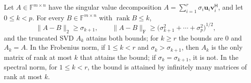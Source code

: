 \begin{theorem}
\label{thm:eckart-young}
Let $A\in\mathbb F^{m\times n}$ have the singular value decomposition $A=\sum_{i=1}^r\sigma_i\mathbf u_i\mathbf v_i^{\mathsf H}$, and let $0\le k<p$. For every $B\in\mathbb F^{m\times n}$ with $\operatorname{rank}B\le k$,
\[
\|A-B\|_2\ge\sigma_{k+1},\qquad\|A-B\|_{\mathrm F}\ge\bigl(\sigma_{k+1}^2+\cdots+\sigma_p^2\bigr)^{1/2},
\]
and the truncated SVD $A_k$ attains both bounds; for $k\ge r$ the bounds are $0$ and $A_k=A$. In the Frobenius norm, if $1\le k<r$ and $\sigma_k>\sigma_{k+1}$, then $A_k$ is the only matrix of rank at most $k$ that attains the bound; if $\sigma_k=\sigma_{k+1}$, it is not. In the spectral norm, for $1\le k<r$, the bound is attained by infinitely many matrices of rank at most $k$.
\end{theorem}

